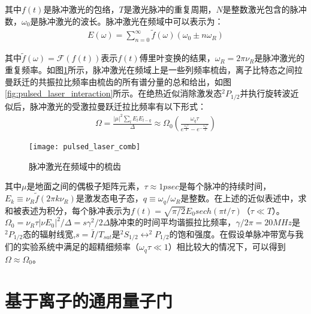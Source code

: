 其中$f(t)$是脉冲激光的包络，$T$是激光脉冲的重复周期，$N
$是整数激光包含的脉冲数，$\omega_0$是脉冲激光的波长。脉冲激光在频域中可以表示为：
\begin{align}
    E(\omega)=\sum_{n=0}^{\infty}\tilde{f}(\omega)(\omega_0\pm n\omega_R)
\end{align}

其中$\tilde{f}(\omega)=\mathcal{F}(f(t))$表示$f(t)$傅里叶变换的结果，$\omega_R=2\pi\nu_R$是脉冲激光的重复频率。如图\ref{fig:pulsed_laser_comb}所示，脉冲激光在频域上是一些列频率梳齿，离子比特态之间拉曼跃迁的共振拉比频率由梳齿的所有谱分量的总和给出，如图\ref{fig:pulsed_laser_interaction}所示。在绝热近似消除激发态$^2P_{1/2}$并执行旋转波近似后，脉冲激光的受激拉曼跃迁拉比频率有以下形式\cite[]{Hayes_Matsukevich_Maunz_Hucul_Quraishi_Olmschenk_Campbell_Mizrahi_Senko_Monroe_2010}：
\begin{align}
    \Omega=\frac{|\mu|^2\sum_{l}^{}E_lE_{l-q}}{\Delta}\approx\Omega_0\left(\frac{\omega_q\tau}{e^{\frac{\omega_q\tau}{2}}-e^{-\frac{\omega_q\tau}{2}}}\right)
\end{align}

\begin{figure}
    \centering
    \caption[脉冲激光在频域中的梳齿]{脉冲激光在频域中的梳齿\cite[Chap1.3]{Mizrahi_2013}\label{fig:pulsed_laser_comb}}
    \texttt{[image: pulsed\_laser\_comb]}
\end{figure}

其中$\mu$是地面之间的偶极子矩阵元素，$\tau\approx 1 psec$是每个脉冲的持续时间，$E_k\equiv \nu_R\tilde{f}(2\pi k\nu_R)$是激发态电子态，$q\equiv\omega_q/\omega_R$是整数。在上述的近似表述中，求和被表述为积分，每个脉冲表示为$f(t)=\sqrt{\pi/2}E_0 sech(\pi t/\tau)$（$\tau\ll T$）。$\Omega_0=\nu_R\tau|\nu E_0|^2/\Delta=s\gamma^2/2\Delta$脉冲束的时间平均谐振拉比频率，$\gamma/2\pi=20MHz$是$^2P_{1/2}$态的辐射线宽,$s=\bar{I}/T_{sat}$是$^2S_{1/2}\leftrightarrow ^2P_{1/2}$的饱和强度。在假设单脉冲带宽与我们的实验系统中满足的超精细频率（$\omega_q\tau\ll 1$）相比较大的情况下，可以得到$\Omega\approx\Omega_0$。








\section[基于离子的通用量子门]{基于离子的通用量子门}

